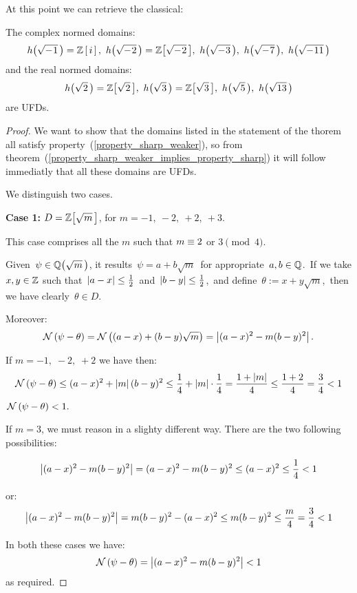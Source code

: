 At this point we can retrieve the classical:

\begin{thm}\label{normed_UFDs_1}
The complex normed domains:
$$
\hhm{1} = \Z\left[\,i\,\right],\ \hhm{2} = \ZZM{2},
\ \hhm{3},\ \hhm{7},\ \hhm{11}
$$
and the real normed domains:
$$
\hh{2} = \ZZ{2},\ \hh{3} = \ZZ{3},\ \hh{5},\ \hh{13}
$$
are UFDs.
\end{thm}

\begin{proof}
%
We want to show that the domains listed in the statement
of the thorem all satisfy property~(\ref{property_sharp_weaker}),
so from theorem~(\ref{property_sharp_weaker_implies_property_sharp})
it will follow immediatly that all these domains are UFDs.

We distinguish two cases.

\smallskip

\textbf{Case 1:} $ D = \ZZ{m}$, for $m = -1,\: -2,\: +2,\: +3$.

This case comprises all the $m$ such that $m \equiv 2$ or $3 \pmod 4$.

Given\, $\psi \in \QQ{m}$, it results
\,$\psi = a + b\sqrt{m}$\, for appropriate\, $a,b\in\mathbb{Q}$.
\,If we take $x,y \in \mathbb{Z}$ such that\,
$\left|a - x\right| \leq \frac{1}{2}$\, and\,
$\left|b - y\right| \leq \frac{1}{2}$,\, and define\,
$\theta := x + y\sqrt{m}$,\, then we have clearly\,
$\theta \in D$.

Moreover:
$$
\mathcal{N}\left(\psi - \theta\right) = \mathcal{N}\left((a - x) + (b - y)\sqrt{m}\right)
= \left|(a - x)^2 - m(b - y)^2\right|.
$$

If $m = -1,\; -2,\; +2$ we have then:
$$
\mathcal{N}\left(\psi - \theta\right) \leq (a - x)^2 + \left|m\right|(b - y)^2
\leq \frac{1}{4} + \left|m\right| \cdot \frac{1}{4}
= \frac{1 + \left|m\right|}{4} \leq \frac{1 + 2}{4} =
\frac{3}{4} < 1
$$
\ie \,$\mathcal{N}\left(\psi - \theta\right) < 1.$

If $m = 3$, we must reason in a slighty different way.
There are the two following possibilities:

$$
\left|(a - x)^2 - m (b - y)^2\right| = (a - x)^2 - m (b - y)^2
\leq (a - x)^2 \leq \frac{1}{4} < 1
$$

or:
$$
\left|(a - x)^2 - m (b - y)^2\right| = m (b - y)^2 - (a - x)^2
\leq m(b - y)^2 \leq \frac{m}{4} = \frac{3}{4} < 1
$$

In both these cases we have:
$$
\mathcal{N}\left(\psi - \theta\right) = \left|(a - x)^2 - m (b-y)^2\right| < 1
$$
as required.


\end{proof}
